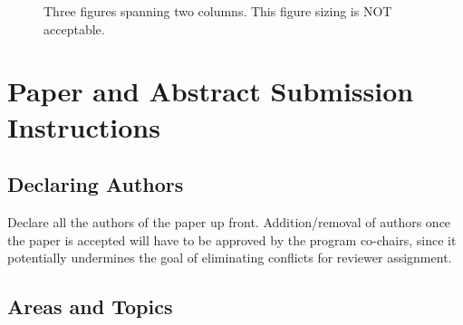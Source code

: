 \documentclass[pageno]{jpaper}
\begin{document}
\begin{figure}[t]%
    \centering
    \caption{Three figures spanning two columns. This figure sizing is NOT acceptable.}%
    \label{fig:threesidebyside}%

\end{figure}

\section{Paper and Abstract Submission Instructions}

\subsection{Declaring Authors}

Declare all the authors of the paper up front. Addition/removal of authors
once the paper is accepted will have to be approved by the program co-chairs,
since it potentially undermines the goal of eliminating conflicts for
reviewer assignment.

\subsection{Areas and Topics}
\end{document}
